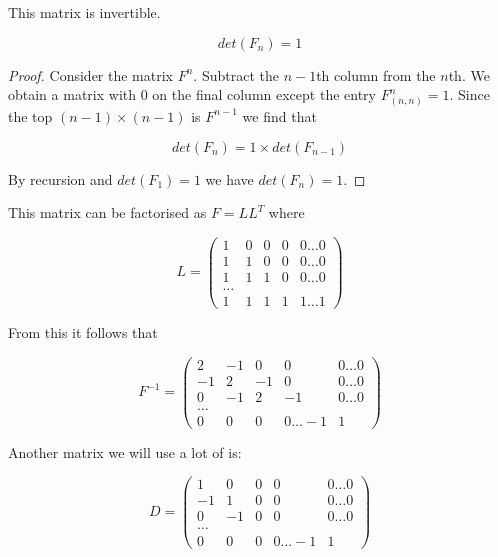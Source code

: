 \documentclass{article}
\begin{document}
This matrix is invertible.

\begin{theorem}
\begin{equation}
det(F_n) = 1
\end{equation}
\end{theorem}
\begin{proof}
Consider the matrix \(F^n\). Subtract the \(n-1\)th column from the \(n\)th. We obtain a matrix with \(0\) on the final column except the entry \(F^n_(n,n) = 1\). Since the top \((n-1) \times (n-1)\) is \(F^{n-1}\) we find that 

\begin{equation}
det(F_n) = 1 \times det(F_{n-1})
\end{equation} 

By recursion and \(det(F_1) = 1\) we have \(det(F_n) = 1\).

\end{proof}

This matrix can be factorised as \(F = LL^T\) where 

\begin{equation}
L = \begin{pmatrix}
 1 & 0 & 0 & 0  & 0 \ldots 0 \\
  1 & 1 & 0 & 0  & 0 \ldots 0\\
     1 & 1 & 1 & 0  & 0 \ldots0  \\
    \ldots  \\
     1 & 1 & 1 & 1  & 1 \ldots 1 
\end{pmatrix}
\end{equation}

From this it follows that

\begin{equation}
F^{-1} = \begin{pmatrix}
 2 & -1 & 0 & 0  & 0 \ldots 0 \\
  -1 & 2 & -1 & 0  & 0 \ldots 0\\
     0 & -1 & 2 & -1  & 0 \ldots0  \\
    \ldots  \\
     0 & 0 & 0 & 0  \ldots -1 & 1 
\end{pmatrix}
\end{equation}

Another matrix we will use a lot of is:

\begin{equation}
D = \begin{pmatrix}
 1 & 0 & 0 & 0  & 0 \ldots 0 \\
  -1 & 1 & 0 & 0  & 0 \ldots 0\\
     0 & -1 & 0 & 0  & 0 \ldots0  \\
    \ldots  \\
     0 & 0 & 0 & 0  \ldots -1 & 1
\end{pmatrix}
\end{equation}
\end{document}
